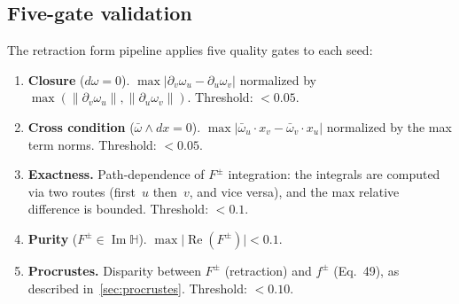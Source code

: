 \documentclass[11pt,a4paper]{article}
\theoremstyle{plain}
\theoremstyle{definition}
\theoremstyle{remark}
\DeclareMathOperator{\Real}{Re}
\DeclareMathOperator{\Imag}{Im}
\newcommand{\HH}{\mathbb{H}}            %
\newcommand{\abs}[1]{\lvert #1 \rvert}
\newcommand{\norm}[1]{\lVert #1 \rVert}
\begin{document}
\subsection{Five-gate validation}\label{sec:fivegate}
The retraction form pipeline applies five quality gates to each seed:
\begin{enumerate}[nosep,label=\textbf{R\arabic*.}]
\item \textbf{Closure} ($d\omega = 0$).
  $\max\abs{\partial_v \omega_u - \partial_u \omega_v}$ normalized
  by $\max(\norm{\partial_v\omega_u}, \norm{\partial_u\omega_v})$.
  Threshold: $< 0.05$.
\item \textbf{Cross condition} ($\bar\omega \wedge dx = 0$).
  $\max\abs{\bar\omega_u \cdot x_v - \bar\omega_v \cdot x_u}$
  normalized by the max term norms.
  Threshold: $< 0.05$.
\item \textbf{Exactness.}
  Path-dependence of $F^\pm$ integration: the integrals are
  computed via two routes (first~$u$ then~$v$, and vice versa),
  and the max relative difference is bounded.
  Threshold: $< 0.1$.
\item \textbf{Purity} ($F^\pm \in \Imag\HH$).
  $\max\abs{\Real(F^\pm)} < 0.1$.
\item \textbf{Procrustes.}
  Disparity between $F^\pm$ (retraction) and $f^\pm$ (Eq.~49),
  as described in~\cref{sec:procrustes}.
  Threshold: $< 0.10$.
\end{enumerate}
\end{document}

